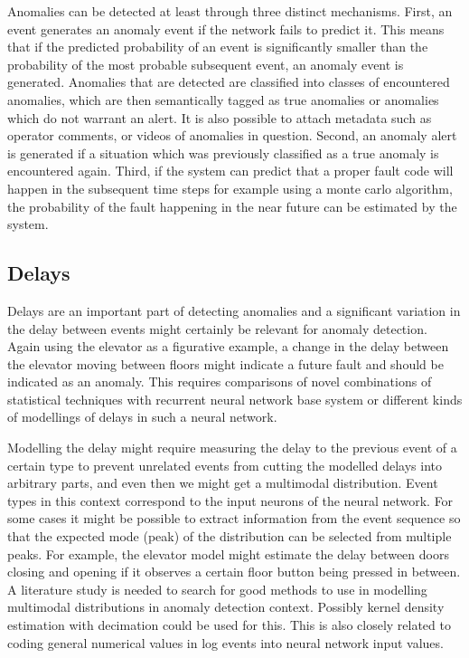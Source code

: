 \documentclass[a4paper,10pt]{article}
\begin{document}
Anomalies can be detected at least through three distinct mechanisms. First, an event generates an anomaly event if the network fails to predict it. This means that
if the predicted probability of an event is significantly smaller than the probability of the most probable subsequent event, an anomaly event is generated.
Anomalies that are detected are classified into classes of encountered anomalies, which are then semantically tagged as true anomalies or anomalies which do not warrant an alert.
It is also possible to attach metadata such as operator comments, or videos of anomalies in question. Second, an anomaly alert is generated if a situation
which was previously classified as a true anomaly is encountered again. Third, if the system can predict that a proper fault code will happen in the subsequent
time steps for example using a monte carlo algorithm, the probability of the fault happening in the near future can be estimated by the system.

\subsection{Delays}

Delays are an important part of detecting anomalies and a significant variation in the delay between events might certainly be relevant for anomaly detection.
Again using the elevator as a figurative example, a change in the delay between the elevator moving between floors might indicate a future fault and should be indicated
as an anomaly. This requires comparisons of novel combinations of statistical techniques with recurrent neural network base system or different kinds of
modellings of delays in such a neural network.

Modelling the delay might require measuring the delay to the previous event of a certain type to prevent unrelated events from cutting the modelled delays into arbitrary parts,
and even then we might get a multimodal distribution. Event types in this context correspond to the input neurons of the neural network.
For some cases it might be possible to extract information from the event sequence so that
the expected mode (peak) of the distribution can be selected from multiple peaks. For example,
the elevator model might estimate the delay between doors closing and opening if it observes a certain floor button being pressed in between.
A literature study is needed to search for good methods to use in modelling multimodal distributions in anomaly detection context. Possibly kernel density estimation
with decimation could be used for this. This is also closely related to coding general numerical values in log events into neural network input values.
\end{document}
